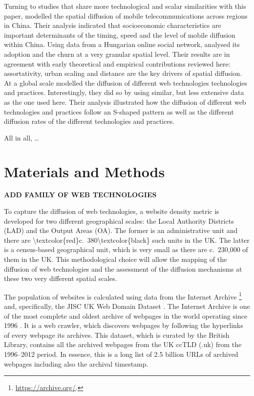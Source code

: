 \documentclass[
  authoryear,
  preprint,
  3p]{elsarticle}
\begin{document}
Turning to studies that share more technological and scalar similarities
with this paper, \citet{ding2010modeling} modelled the spatial diffusion
of mobile telecommunications across regions in China. Their analysis
indicated that socioeconomic characteristics are important determinants
of the timing, speed and the level of mobile diffusion within China.
Using data from a Hungarian online social network,
\citet{lengyel2020role} analysed its adoption and the churn at a very
granular spatial level. Their results are in agreement with early
theoretical and empirical contributions reviewed here: assortativity,
urban scaling and distance are the key drivers of spatial diffusion. At
a global scale \citet{PAPAGIANNIDIS2015308} modelled the diffusion of
different web technologies technologies and practices. Interestingly,
they did so by using similar, but less extensive data as the one used
here. Their analysis illustrated how the diffusion of different web
technologies and practices follow an S-shaped pattern as well as the
different diffusion rates of the different technologies and practices.

All in all, \ldots{}

\section{Materials and Methods}\label{sec3}

\textbf{ADD FAMILY OF WEB TECHNOLOGIES}

To capture the diffusion of web technologies, a website density metric
is developed for two different geographical scales: the Local Authority
Districts (LAD) and the Output Areas (OA). The former is an
administrative unit and there are
\textbackslash textcolor\{red\}c.~380\textbackslash textcolor\{black\}
such units in the UK. The latter is a census-based geographical unit,
which is very small as there are c.~230,000 of them in the UK. This
methodological choice will allow the mapping of the diffusion of web
technologies and the assessment of the diffusion mechanisms at these two
very different spatial scales.

The population of websites is calculated using data from the Internet
Archive \footnote{\href{See\%20https://archive.org/}{https://archive.org/}.}
and, specifically, the JISC UK Web Domain Dataset \citep{ukwebarchive}.
The Internet Archive is one of the most complete and oldest archive of
webpages in the world operating since 1996
\citep{ainsworth2011much, holzmann2016dawn}. It is a web crawler, which
discovers webpages by following the hyperlinks of every webpage its
archives. This dataset, which is curated by the British Library,
contains all the archived webpages from the UK ccTLD (.uk) from the
1996--2012 period. In essence, this is a long list of 2.5 billion URLs
of archived webpages including also the archival timestamp.
\end{document}
